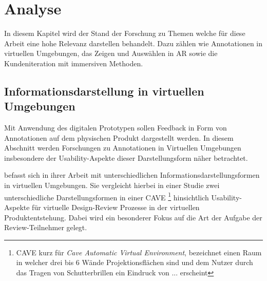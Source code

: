 \chapter{Analyse} \label{anlayse_capter}

In diesem Kapitel wird der Stand der Forschung zu Themen welche für diese Arbeit eine hohe Relevanz darstellen behandelt. Dazu zählen wie Annotationen in virtuellen Umgebungen, das Zeigen und Auswählen in AR sowie die Kundeniteration mit immersiven Methoden.

\section{Informationsdarstellung in virtuellen Umgebungen}\label{brand_abschnitt}

Mit Anwendung des digitalen Prototypen sollen Feedback in Form von Annotationen auf dem physischen Produkt dargestellt werden. 
In diesem Abschnitt werden Forschungen zu Annotationen in Virtuellen Umgebungen insbesondere der Usability-Aspekte dieser Darstellungsform näher betrachtet. 

\citeauthor{Brandenburg2019} befasst sich in ihrer Arbeit mit unterschiedlichen Informationsdarstellungsformen in virtuellen Umgebungen.
Sie vergleicht hierbei in einer Studie zwei unterschiedliche Darstellungsformen in einer CAVE \footnote{CAVE kurz für \textit{Cave Automatic Virtual Environment}, bezeichnet einen Raum in welcher drei bis 6 Wände Projektionsflächen sind und dem Nutzer durch das Tragen von Schutterbrillen ein Eindruck von ... erscheint } hinsichtlich Usability-Aspekte für virtuelle Design-Review Prozesse in der virtuellen Produktentstehung. Dabei wird ein besonderer Fokus auf die Art der Aufgabe der Review-Teilnehmer gelegt.
\cite[S.~48]{Brandenburg2019}

